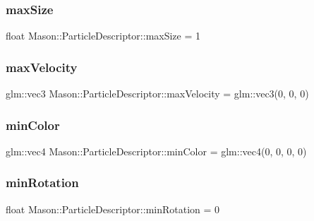 \subsubsection{\texorpdfstring{max\+Size}{maxSize}}
{\footnotesize\ttfamily float Mason\+::\+Particle\+Descriptor\+::max\+Size = 1}

\hypertarget{class_mason_1_1_particle_descriptor_afc679429239c6e9c40b5c2e75228e2c1}{}\label{class_mason_1_1_particle_descriptor_afc679429239c6e9c40b5c2e75228e2c1} 
\subsubsection{\texorpdfstring{max\+Velocity}{maxVelocity}}
{\footnotesize\ttfamily glm\+::vec3 Mason\+::\+Particle\+Descriptor\+::max\+Velocity = glm\+::vec3(0, 0, 0)}

\hypertarget{class_mason_1_1_particle_descriptor_a86b3ee8f533d314ed0f0e48228144a25}{}\label{class_mason_1_1_particle_descriptor_a86b3ee8f533d314ed0f0e48228144a25} 
\subsubsection{\texorpdfstring{min\+Color}{minColor}}
{\footnotesize\ttfamily glm\+::vec4 Mason\+::\+Particle\+Descriptor\+::min\+Color = glm\+::vec4(0, 0, 0, 0)}

\hypertarget{class_mason_1_1_particle_descriptor_a086f4988188e22f066e93529cb02608c}{}\label{class_mason_1_1_particle_descriptor_a086f4988188e22f066e93529cb02608c} 
\subsubsection{\texorpdfstring{min\+Rotation}{minRotation}}
{\footnotesize\ttfamily float Mason\+::\+Particle\+Descriptor\+::min\+Rotation = 0}

\hypertarget{class_mason_1_1_particle_descriptor_a5bbc1147b832c903cee0b6ebe964d8c3}{}\label{class_mason_1_1_particle_descriptor_a5bbc1147b832c903cee0b6ebe964d8c3} 
